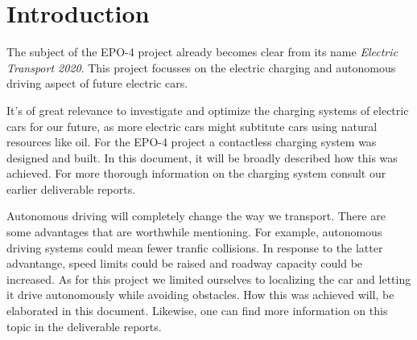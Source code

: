 \documentclass[11pt,titlepage]{report}
\begin{document}
\chapter{Introduction}
The subject of the EPO-4 project already becomes clear from its name \textit{Electric Transport 2020}. This project focusses on the electric charging and autonomous driving aspect of future electric cars.

It's of great relevance to investigate and optimize the charging systems of electric cars for our future, as more electric cars might subtitute cars using natural resources like oil. For the EPO-4 project a contactless charging system was designed and built. In this document, it will be broadly described how this was achieved. For more thorough information on the charging system consult our earlier deliverable reports. 

Autonomous driving will completely change the way we transport. There are some advantages that are worthwhile mentioning. For example, autonomous driving systems could mean fewer tranfic collisions. In response to the latter advantange, speed limits could be raised and roadway capacity could be increased. As for this project we limited ourselves to localizing the car and letting it drive autonomously while avoiding obstacles. How this was achieved will, be elaborated in this document. Likewise, one can find more information on this topic in the deliverable reports. 
\end{document}
